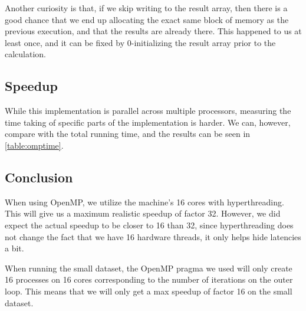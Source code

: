 \documentclass[11pt]{article}
\begin{document}
Another curiosity is that, if we skip writing to the result array, then there
is a good chance that we end up allocating the exact same block of memory as the 
previous execution, and that the results are already there. This happened to us
at least once, and it can be fixed by 0-initializing the result array prior to
the calculation.


\subsection{Speedup}
While this implementation is parallel across multiple processors, measuring the
time taking of specific parts of the implementation is harder. We can, however, 
compare with the total running time, and the results can be seen in 
\autoref{table:omptime}.

\begin{table}[h]
\centering
{}
\caption{Speedup comparison of the original implementation and the OpenMP implementation}
\label{table:omptime}
\end{table}

\subsection{Conclusion}
When using OpenMP, we utilize the machine's 16 cores with hyperthreading. 
This will give us a maximum realistic speedup of factor 32.
However, we did expect the actual speedup to be closer to 16 than 32, since hyperthreading does not change the fact that we have 16 hardware threads, it only helps hide latencies a bit.

When running the small 
dataset, the OpenMP pragma we used will only create 16 processes on 16 cores
corresponding to the number of iterations on the outer loop. This means that 
we will only get a max speedup of factor 16 on the small dataset. 
\end{document}
